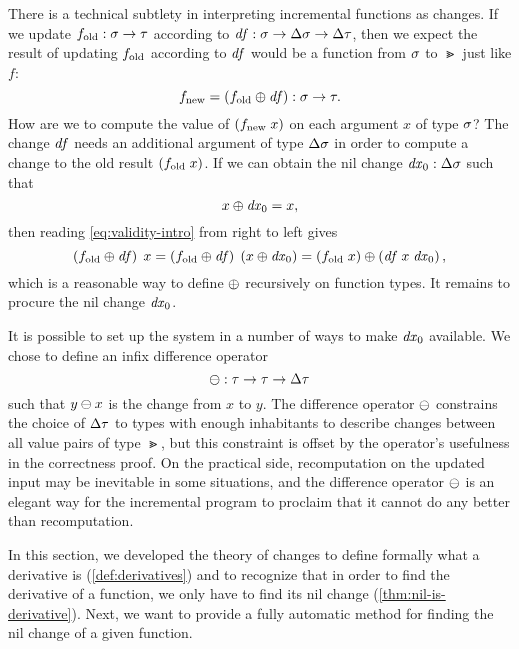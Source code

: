\begin{oldSec}
There is a technical subtlety in interpreting incremental
functions as changes. If we update
$\HasType {\Old f} {\Fun\Gs\Gt}$
according to
$\HasType {\D f} {\Fun \Gs {\Fun {\Change\Gs} {\Change\Gt}}}$,
then we expect the result of updating $f_{\textrm{old}}$ according to
$\mathit{df}$ would be a function from $\sigma$ to $\Gt$ just like $f$:
\[
\New f = \HasType {\Apply* {\D f} {\Old f}} {\Fun \Gs \Gt}.
\]
How are we to compute the value of $\App* {\New f} x$ on each
argument $x$ of type $\sigma$? The change $\mathit{df}$ needs an additional
argument of type $\Change\Gs$ in order to compute a change to the
old result $\App* {\Old f} x$. If we can obtain the nil change
$\HasType {\D x_0} {\Change\Gs}$ such that
\[
\Apply {\D x_0} x = x,
\]
then reading \cref{eq:validity-intro} from right to
left gives
\[
\App {\Apply* {\D f} {\Old f}} x
=
\App {\Apply* {\D f} {\Old f}} {\Apply* {\D x_0} x}
=
\Apply {\App* {\App {\D f} x} {\D x_0}} {\App*{\Old f} x},
\]
which is a reasonable way to define $\APPLY$ recursively on
function types. It remains to procure the nil change $\mathit{dx}_0$.

It is possible to set up the system in a number of ways to make
$\mathit{dx}_0$ available. We chose to define an infix difference
operator
\[
\HasType \DIFF {\Fun \Gt {\Fun \Gt {\Change\Gt}}}
\]
such that $\Diff y x$ is the change from $x$ to $y$. The
difference operator $\DIFF$ constrains the choice of $\Change\Gt$
to types with enough inhabitants to describe changes between all
value pairs of type $\Gt$, but this constraint is offset by the
operator's usefulness in the correctness proof. On the practical
side, recomputation on the updated input may be inevitable in
some situations, and the difference operator $\DIFF$ is an
elegant way for the incremental program to proclaim that it
cannot do any better than recomputation.

\end{oldSec}


In this section, we developed the theory of changes to define
formally what a derivative is (\cref{def:derivatives}) and to
recognize that in order to find the derivative of a function, we
only have to find its nil change
(\cref{thm:nil-is-derivative}). Next, we want to provide a fully
automatic method for finding the nil change of a given function.
